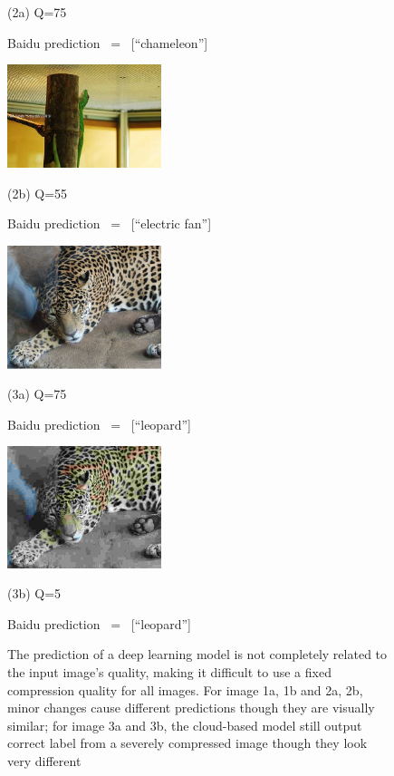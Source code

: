\begin{figure}[!t]
\begin{minipage}{0.4\linewidth}
		\centerline{(2a) Q=75}
		\centerline{Baidu prediction \ = \ [``chameleon'']}
		\vspace{0.4cm}
	\end{minipage}
	\hfill
	\begin{minipage}{0.4\linewidth}
		\centerline{\includegraphics[width=4.5cm, trim=0 0 0 0]{figures/chameleon_q55.jpeg}}
		\centerline{(2b) Q=55}
 		\centerline{Baidu prediction \ = \ [``electric fan'']}
 		\vspace{0.4cm}
	\end{minipage}
	\vfill
	\begin{minipage}{0.4\linewidth}
		\centerline{\includegraphics[width=4.5cm, trim=0 0 0 0, clip]{figures/tiger_highq.jpeg}}
		\centerline{(3a) Q=75}
		\centerline{Baidu prediction \ = \ [``leopard'']}
		\vspace{0.4cm}
	\end{minipage}
	\hfill
	\begin{minipage}{0.4\linewidth}
		\centerline{\includegraphics[width=4.5cm, trim=0 0 0 0, clip]{figures/tiger_lowq.jpeg}}
		\centerline{(3b) Q=5}
		\centerline{Baidu prediction \ = \ [``leopard'']}
	\end{minipage}
	\caption{The prediction of a deep learning model is not completely related to the input image's quality, making it difficult to use a fixed compression quality for all images. For image 1a, 1b and 2a, 2b, minor changes cause different predictions though they are visually similar; for image 3a and 3b, the cloud-based model still output correct label from a severely compressed image though they look very different}
	\label{fig: compress_accuracy}
\end{figure}

